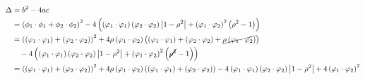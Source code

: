 \documentclass{article}[a4]
\begin{document}
\begin{align*}
\Delta &= b^2 - 4ac \\
  &= \left( \phi_1 \cdot \phi_1 + \phi_2 \cdot \phi_2 \right)^2 - 4 \left( \left( \varphi_1\cdot\varphi_1 \right) \left( \varphi_2\cdot\varphi_2 \right) \left| 1 - \rho^2 \right| + \left( \varphi_1\cdot\varphi_2 \right)^2 \left( \rho^2 - 1 \right) \right) \\
  &= \left( \left( \varphi_1\cdot\varphi_1 \right) + \left( \varphi_2\cdot\varphi_2 \right) \right)^2 + 4 \rho \left( \varphi_1\cdot\varphi_2 \right) \left( \left( \varphi_1\cdot\varphi_1 \right) + \left( \varphi_2\cdot\varphi_2 \right) + \cancel{\rho \left( \varphi_1\cdot\varphi_2 \right)} \right) \\
    & \quad - 4 \left( \left( \varphi_1\cdot\varphi_1 \right) \left( \varphi_2\cdot\varphi_2 \right) \left| 1 - \rho^2 \right| + \left( \varphi_1\cdot\varphi_2 \right)^2 \left( \cancel{\rho^2} - 1 \right) \right) \\
  &= \left( \left( \varphi_1\cdot\varphi_1 \right) + \left( \varphi_2\cdot\varphi_2 \right) \right)^2 + 4 \rho \left( \varphi_1\cdot\varphi_2 \right) \left( \left( \varphi_1\cdot\varphi_1 \right) + \left( \varphi_2\cdot\varphi_2 \right) \right) - 4 \left( \varphi_1\cdot\varphi_1 \right) \left( \varphi_2\cdot\varphi_2 \right) \left| 1 - \rho^2 \right| + 4 \left( \varphi_1\cdot\varphi_2 \right)^2 \\
\end{align*}
\end{document}
